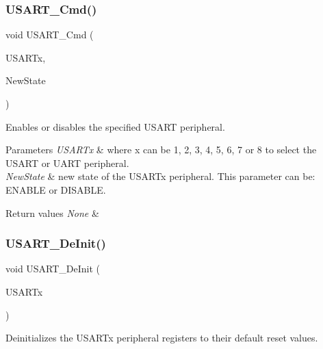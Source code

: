 \subsubsection{\texorpdfstring{U\+S\+A\+R\+T\+\_\+\+Cmd()}{USART\_Cmd()}}
{\footnotesize\ttfamily void U\+S\+A\+R\+T\+\_\+\+Cmd (\begin{DoxyParamCaption}\item[{U\+S\+A\+R\+T\+\_\+\+Type\+Def $\ast$}]{U\+S\+A\+R\+Tx,  }\item[{Functional\+State}]{New\+State }\end{DoxyParamCaption})}



Enables or disables the specified U\+S\+A\+RT peripheral. 


\begin{DoxyParams}{Parameters}
{\em U\+S\+A\+R\+Tx} & where x can be 1, 2, 3, 4, 5, 6, 7 or 8 to select the U\+S\+A\+RT or U\+A\+RT peripheral. \\
\hline
{\em New\+State} & new state of the U\+S\+A\+R\+Tx peripheral. This parameter can be\+: E\+N\+A\+B\+LE or D\+I\+S\+A\+B\+LE. \\
\hline
\end{DoxyParams}

\begin{DoxyRetVals}{Return values}
{\em None} & \\
\hline
\end{DoxyRetVals}
\mbox{\label{group___u_s_a_r_t___group1_ga2f8e1ce72da21b6539d8e1f299ec3b0d}} 
\subsubsection{\texorpdfstring{U\+S\+A\+R\+T\+\_\+\+De\+Init()}{USART\_DeInit()}}
{\footnotesize\ttfamily void U\+S\+A\+R\+T\+\_\+\+De\+Init (\begin{DoxyParamCaption}\item[{U\+S\+A\+R\+T\+\_\+\+Type\+Def $\ast$}]{U\+S\+A\+R\+Tx }\end{DoxyParamCaption})}



Deinitializes the U\+S\+A\+R\+Tx peripheral registers to their default reset values. 


